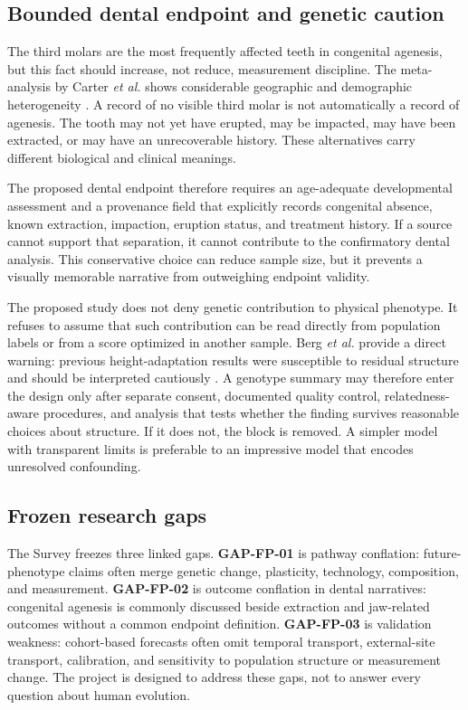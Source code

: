 \documentclass[conference]{IEEEtran}
\begin{document}
\subsection{Bounded dental endpoint and genetic caution}

The third molars are the most frequently affected teeth in congenital
agenesis, but this fact should increase, not reduce, measurement discipline.
The meta-analysis by Carter \emph{et al.} shows considerable geographic and
demographic heterogeneity \cite{carter2015}. A record of no visible third
molar is not automatically a record of agenesis. The tooth may not yet have
erupted, may be impacted, may have been extracted, or may have an
unrecoverable history. These alternatives carry different biological and
clinical meanings.

The proposed dental endpoint therefore requires an age-adequate developmental
assessment and a provenance field that explicitly records congenital absence,
known extraction, impaction, eruption status, and treatment history. If a
source cannot support that separation, it cannot contribute to the
confirmatory dental analysis. This conservative choice can reduce sample size,
but it prevents a visually memorable narrative from outweighing endpoint
validity.

The proposed study does not deny genetic contribution to physical phenotype.
It refuses to assume that such contribution can be read directly from
population labels or from a score optimized in another sample. Berg
\emph{et al.} provide a direct warning: previous height-adaptation results
were susceptible to residual structure and should be interpreted cautiously
\cite{berg2019}. A genotype summary may therefore enter the design only after
separate consent, documented quality control, relatedness-aware procedures,
and analysis that tests whether the finding survives reasonable choices about
structure. If it does not, the block is removed. A simpler model with
transparent limits is preferable to an impressive model that encodes
unresolved confounding.

\subsection{Frozen research gaps}

The Survey freezes three linked gaps. \textbf{GAP-FP-01} is pathway
conflation: future-phenotype claims often merge genetic change, plasticity,
technology, composition, and measurement. \textbf{GAP-FP-02} is outcome
conflation in dental narratives: congenital agenesis is commonly discussed
beside extraction and jaw-related outcomes without a common endpoint
definition. \textbf{GAP-FP-03} is validation weakness: cohort-based forecasts
often omit temporal transport, external-site transport, calibration, and
sensitivity to population structure or measurement change. The project is
designed to address these gaps, not to answer every question about human
evolution.
\end{document}
